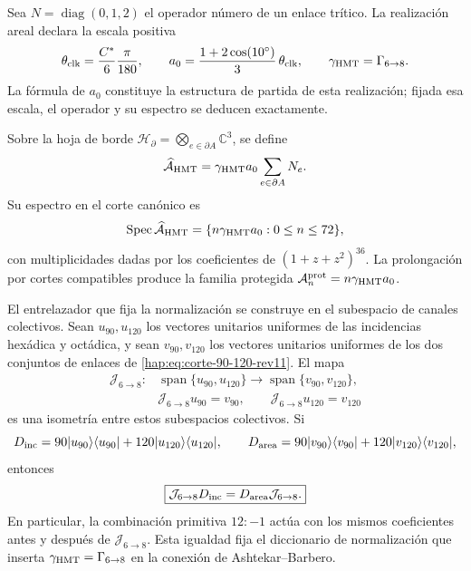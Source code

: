 Sea \(N=\operatorname{diag}(0,1,2)\) el operador número de un enlace trítico.
La realización areal declara la escala positiva
\[
 \theta_{\rm clk}=\frac{C^*}{6}\frac{\pi}{180},
 \qquad
 a_0=\frac{1+2\cos(10^\circ)}{3}\,\theta_{\rm clk},
 \qquad \gamma_{\rm HMT}=\Gamma_{6\to8}.
\]
La fórmula de \(a_0\) constituye la estructura de partida de esta
realización; fijada esa escala, el operador y su espectro se deducen
exactamente.

\begin{definition}
Sobre la hoja de borde
\(\mathcal H_{\partial}=\bigotimes_{e\in\partial A}\mathbb C^3\), se define
\begin{equation}
 \widehat{\mathcal A}_{\rm HMT}
 =\gamma_{\rm HMT}a_0\sum_{e\in\partial A}N_e.
 \label{hap:eq:operador-area-hmt-rev11}
\end{equation}
Su espectro en el corte canónico es
\[
 \operatorname{Spec}\widehat{\mathcal A}_{\rm HMT}
 =\{n\gamma_{\rm HMT}a_0:0\leq n\leq72\},
\]
con multiplicidades dadas por los coeficientes de
\((1+z+z^2)^{36}\). La prolongación por cortes compatibles produce la
familia protegida \(\mathcal A_n^{\rm prot}=n\gamma_{\rm HMT}a_0\).
\end{definition}

El entrelazador que fija la normalización se construye en el subespacio de
canales colectivos. Sean \(u_{90},u_{120}\) los vectores unitarios uniformes
de las incidencias hexádica y octádica, y sean \(v_{90},v_{120}\) los
vectores unitarios uniformes de los dos conjuntos de enlaces de
\eqref{hap:eq:corte-90-120-rev11}. El mapa
\begin{equation}
 \begin{aligned}
 \mathcal J_{6\to8}:{}
 &\operatorname{span}\{u_{90},u_{120}\}
 \longrightarrow
 \operatorname{span}\{v_{90},v_{120}\},\\
 &\mathcal J_{6\to8}u_{90}=v_{90},
 \qquad
 \mathcal J_{6\to8}u_{120}=v_{120}
 \end{aligned}
 \label{hap:eq:entrelazador-area-barbero-rev11}
\end{equation}
es una isometría entre estos subespacios colectivos. Si
\[
 D_{\rm inc}=90|u_{90}\rangle\langle u_{90}|
 +120|u_{120}\rangle\langle u_{120}|,
 \qquad
 D_{\rm area}=90|v_{90}\rangle\langle v_{90}|
 +120|v_{120}\rangle\langle v_{120}|,
\]
entonces
\[
 \boxed{\mathcal J_{6\to8}D_{\rm inc}
 =D_{\rm area}\mathcal J_{6\to8}.}
\]
En particular, la combinación primitiva \(12:-1\) actúa
con los mismos coeficientes antes y después de \(\mathcal J_{6\to8}\). Esta
igualdad fija el diccionario de normalización que inserta
\(\gamma_{\rm HMT}=\Gamma_{6\to8}\) en la conexión de
Ashtekar--Barbero.


